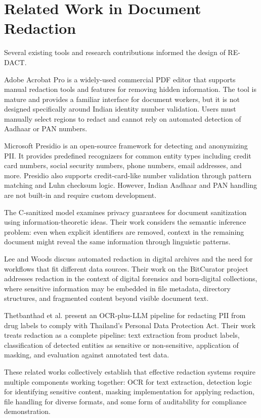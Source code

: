 \bigskip

\section{Related Work in Document Redaction}

Several existing tools and research contributions informed the design of RE-DACT.

Adobe Acrobat Pro is a widely-used commercial PDF editor that supports manual redaction tools and features for removing hidden information. The tool is mature and provides a familiar interface for document workers, but it is not designed specifically around Indian identity number validation. Users must manually select regions to redact and cannot rely on automated detection of Aadhaar or PAN numbers.

Microsoft Presidio is an open-source framework for detecting and anonymizing PII. It provides predefined recognizers for common entity types including credit card numbers, social security numbers, phone numbers, email addresses, and more. Presidio also supports credit-card-like number validation through pattern matching and Luhn checksum logic. However, Indian Aadhaar and PAN handling are not built-in and require custom development.

The C-sanitized model examines privacy guarantees for document sanitization using information-theoretic ideas. Their work considers the semantic inference problem: even when explicit identifiers are removed, context in the remaining document might reveal the same information through linguistic patterns.

Lee and Woods discuss automated redaction in digital archives and the need for workflows that fit different data sources. Their work on the BitCurator project addresses redaction in the context of digital forensics and born-digital collections, where sensitive information may be embedded in file metadata, directory structures, and fragmented content beyond visible document text.

Thetbanthad et al. present an OCR-plus-LLM pipeline for redacting PII from drug labels to comply with Thailand's Personal Data Protection Act. Their work treats redaction as a complete pipeline: text extraction from product labels, classification of detected entities as sensitive or non-sensitive, application of masking, and evaluation against annotated test data.

These related works collectively establish that effective redaction systems require multiple components working together: OCR for text extraction, detection logic for identifying sensitive content, masking implementation for applying redaction, file handling for diverse formats, and some form of auditability for compliance demonstration.

